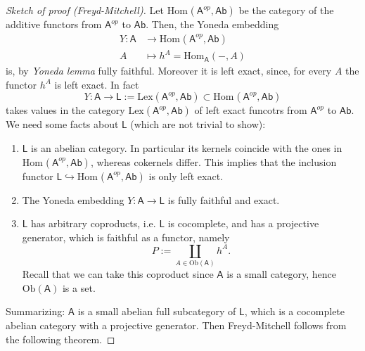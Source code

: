 \begin{proof}[Sketch of proof (Freyd-Mitchell)]
	Let $\mathrm{Hom}_{ }\left( \mathsf{A}^{op}, \mathsf{Ab} \right)$ be the category of the additive functors from $\mathsf{A}^{op}$ to $\mathsf{Ab}$.
	Then, the Yoneda embedding
	\begin{align}
		Y: \mathsf{A} &\to \mathrm{Hom}_{ }\left( \mathsf{A}^{op}, \mathsf{Ab} \right) \\
		A &\mapsto h^A = \mathrm{Hom}_{\mathsf{A}} \left( -, A \right)
	\end{align} 
	is, by \textit{Yoneda lemma} fully faithful.
	Moreover it is left exact, since, for every $A$ the functor $h^A$ is left exact.
	In fact
	\begin{equation}
		Y: \mathsf{A} \to \mathsf{L} := \mathrm{Lex} \left(\mathsf{A}^{op}, \mathsf{Ab}\right) \subset
		\mathrm{Hom}_{ }\left( \mathsf{A}^{op}, \mathsf{Ab} \right)
	\end{equation} 
	takes values in the category $\mathrm{Lex}\left(\mathsf{A}^{op}, \mathsf{Ab}\right)$ of
	left exact funcotrs from $\mathsf{A}^{op}$ to $\mathsf{Ab}$.
	We need some facts about $\mathsf{L}$ (which are not trivial to show):
	\begin{enumerate}
		\item $\mathsf{L}$ is an abelian category.
			In particular its kernels coincide with the ones in $\mathrm{Hom}_{ }\left( \mathsf{A}^{op}, \mathsf{Ab} \right)$,
			whereas cokernels differ.
			This implies that the inclusion functor $\mathsf{L} \hookrightarrow \mathrm{Hom}_{ }\left( \mathsf{A}^{op}, \mathsf{Ab} \right)$
			is only left exact.
		\item The Yoneda embedding $Y: \mathsf{A} \to \mathsf{L}$ is fully faithful and exact.
		\item $\mathsf{L}$ has arbitrary coproducts, i.e. $\mathsf{L}$ is cocomplete,
			and has a projective generator, which is faithful as a functor, 
			namely
			\begin{equation}
			P := \coprod_{A \in \mathrm{Ob} \left(\mathsf{A}\right)} h^A
			.\end{equation} 
			Recall that we can take this coproduct since $\mathsf{A}$ is a small category,
			hence $\mathrm{Ob} \left(\mathsf{A}\right)$ is a set.
	\end{enumerate}
	Summarizing: $\mathsf{A}$ is a small abelian full subcategory of $\mathsf{L}$, which is a
	cocomplete abelian category with a projective generator.
	Then Freyd-Mitchell follows from the following theorem.
\end{proof}

